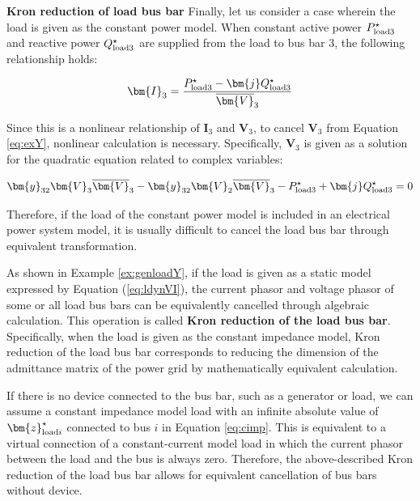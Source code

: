 \documentclass[graybox, envcountchap]{svmult}
\begin{document}
\begin{example}{\textbf{Kron reduction of load bus bar}}
Finally, let us consider a case wherein the load is given as the constant power
model. When constant active power $P_{{\rm load}3}^{\star}$ and reactive
power $Q_{{\rm load}3}^{\star}$ are supplied from the load to bus bar 3, the
following relationship holds:

\begin{equation*}
  \bm{I}_3 = \frac{P_{{\rm load}3}^{\star} - \bm{j} Q_{{\rm load}3}^{\star} }{\overline{\bm{V}}_3}
\end{equation*}

Since this is a nonlinear relationship of $\bm{I}_3$ and $\bm{V}_3$, to cancel
$\bm{V}_3$ from Equation \ref{eq:exY}, nonlinear calculation is necessary.
Specifically, $\bm{V}_3$ is given as a solution for the quadratic equation
related to complex variables:

\begin{equation*}
  \bm{y}_{32} \bm{V}_3 \overline{\bm{V}}_3 - \bm{y}_{32}  \bm{V}_2 \overline{\bm{V}}_3 -P_{{\rm load}3}^{\star} 
  + \bm{j} Q_{{\rm load}3}^{\star} =0
\end{equation*}

Therefore, if the load of the constant power model is included in an electrical
power system model, it is usually difficult to cancel the load bus bar through
equivalent transformation.

\end{example}

As shown in Example \ref{ex:genloadY}, if the load is given as a static model
expressed by Equation (\ref{eq:ldynVI}), the current phasor and voltage phasor
of some or all load bus bars can be equivalently cancelled through algebraic
calculation. This operation is called \textbf{Kron reduction of the load bus
bar}. Specifically, when the load is given as the constant impedance model,
Kron reduction of the load bus bar corresponds to reducing the dimension of the
admittance matrix of the power grid by mathematically equivalent calculation.

If there is no device connected to the bus bar, such as a generator or load,
we can assume a constant impedance model load with an infinite absolute value of
$\bm{z}_{{\rm load}i}^{\star}$ connected to bus $i$ in Equation \ref{eq:cimp}.
This is equivalent to a virtual connection of a constant-current model load in
which the current phasor between the load and the bus is always zero. Therefore,
the above-described Kron reduction of the load bus bar allows for equivalent
cancellation of bus bars without device.
\end{document}
